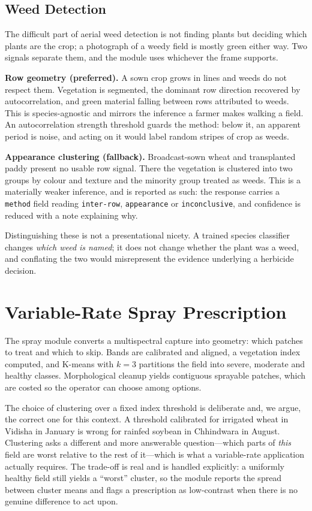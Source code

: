 \documentclass[conference]{IEEEtran}
\begin{document}
\subsection{Weed Detection}

The difficult part of aerial weed detection is not finding plants but deciding
which plants are the crop; a photograph of a weedy field is mostly green either
way. Two signals separate them, and the module uses whichever the frame
supports.

\textbf{Row geometry (preferred).} A sown crop grows in lines and weeds do not
respect them. Vegetation is segmented, the dominant row direction recovered by
autocorrelation, and green material falling between rows attributed to weeds.
This is species-agnostic and mirrors the inference a farmer makes walking a
field. An autocorrelation strength threshold guards the method: below it, an
apparent period is noise, and acting on it would label random stripes of crop
as weeds.

\textbf{Appearance clustering (fallback).} Broadcast-sown wheat and
transplanted paddy present no usable row signal. There the vegetation is
clustered into two groups by colour and texture and the minority group treated
as weeds. This is a materially weaker inference, and is reported as such: the
response carries a \texttt{method} field reading \texttt{inter-row},
\texttt{appearance} or \texttt{inconclusive}, and confidence is reduced with a
note explaining why.

Distinguishing these is not a presentational nicety. A trained species
classifier changes \emph{which weed is named}; it does not change whether the
plant was a weed, and conflating the two would misrepresent the evidence
underlying a herbicide decision.

\section{Variable-Rate Spray Prescription}

The spray module converts a multispectral capture into geometry: which patches
to treat and which to skip. Bands are calibrated and aligned, a vegetation
index computed, and K-means with $k=3$ partitions the field into severe,
moderate and healthy classes. Morphological cleanup yields contiguous
sprayable patches, which are costed so the operator can choose among options.

The choice of clustering over a fixed index threshold is deliberate and, we
argue, the correct one for this context. A threshold calibrated for irrigated
wheat in Vidisha in January is wrong for rainfed soybean in Chhindwara in
August. Clustering asks a different and more answerable question---which parts
of \emph{this} field are worst relative to the rest of it---which is what a
variable-rate application actually requires. The trade-off is real and is
handled explicitly: a uniformly healthy field still yields a ``worst'' cluster,
so the module reports the spread between cluster means and flags a prescription
as low-contrast when there is no genuine difference to act upon.
\end{document}
